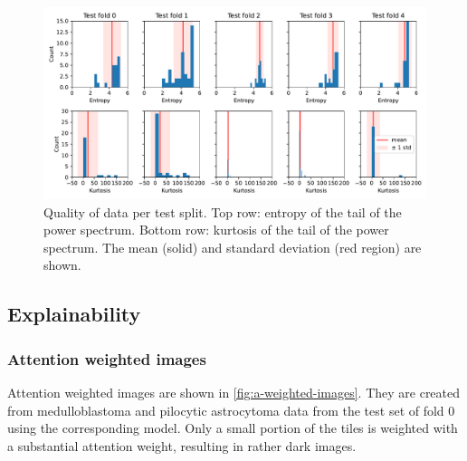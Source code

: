 \begin{figure}
    \centering
    \includegraphics[width=\linewidth]{pediatric-brain-tumours/images/entropy-kurtosis-per-fold-split-test.pdf}
    \caption[Quality of data per test split]{
        Quality of data per test split.
        Top row: entropy of the tail of the power spectrum.
        Bottom row: kurtosis of the tail of the power spectrum.
        The mean (solid) and standard deviation (red region) are shown.
    }
    \label{fig:data-quality-per-fold}
\end{figure}

\subsection{Explainability}
\subsubsection{Attention weighted images}
Attention weighted images are shown in \cref{fig:a-weighted-images}.
They are created from medulloblastoma and pilocytic astrocytoma data from the test set of fold 0 using the corresponding model.
Only a small portion of the tiles is weighted with a substantial attention weight, resulting in rather dark images.

